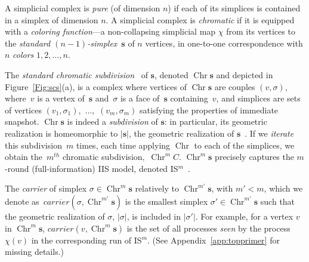 \documentclass[a4paper]{article}
\def\s {\mathbf{s}}
\def\Chr{\operatorname{Chr}}
\def\Car{\mathit{carrier}}
\begin{document}

A simplicial complex is \emph{pure} (of dimension $n$) if each of its simplices 
is contained in a simplex of dimension $n$.
A simplicial complex is \emph{chromatic} if it is equipped with 
a \emph{coloring function}---a non-collapsing simplicial map $\chi$ from its vertices to 
the {\em standard $(n-1)$-simplex}~$\s$ of $n$ vertices, in 
one-to-one correspondence with $n$ {\em colors} $1,2, \dots, n$. 
%

The \emph{standard chromatic subdivision}~\cite{HS99} of $\s$, denoted
$\Chr\s$ and depicted in Figure~\ref{Fig:scs}(a), is a complex where vertices of $\Chr\s$ are couples $(v, \sigma)$, where~$v$ is a 
vertex of~$\s$ and~$\sigma$ is a face of~$\s$ containing~$v$, and
simplices are sets of vertices
$(v_1,\sigma_1)$,~$\ldots$,~$(v_m,\sigma_m)$  satisfying the
properties of immediate snapshot. 
%
$\Chr\s$ is indeed a \emph{subdivision} of $\s$: in particular, 
its geometric realization is homeomorphic to $|\s|$, the geometric realization of $\s$~\cite{Koz12}.
%
If we \emph{iterate} this subdivision~$m$ times, each time 
applying $\Chr$ to each of the simplices, we 
obtain the~$m^{th}$ chromatic subdivision,~$\Chr^m C$.
$\Chr^m \s$ precisely captures  the $m$-round 
(full-information) IIS model, denoted IS$^m$~\cite{HS99}.

The \emph{carrier} of simplex $\sigma\in\Chr^m\s$ relatively to $\Chr^{m'}\s$, 
with $m'<m$, which we denote as~$\Car(\sigma,\Chr^{m'}\s)$ is 
the smallest simplex $\sigma'\in\Chr^{m'}\s$ such that the geometric 
realization of $\sigma$, $|\sigma|$, is included in $|\sigma'|$. 
For example, for a vertex $v$ in $\Chr^m\s$, 
$\Car(v,\Chr^m\s)$ is the set of all processes \emph{seen} by 
the process~$\chi(v)$ in the corresponding run of IS$^m$.
(See Appendix~\ref{app:topprimer} for missing details.)
\end{document}
